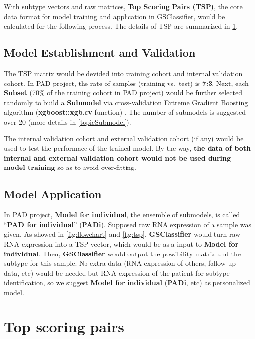 \documentclass[
  12pt,
]{book}
\begin{document}
With subtype vectors and raw matrices, \textbf{Top Scoring Pairs (TSP)}, the core data format for model training and application in GSClassifier, would be calculated for the following process. The details of TSP are summarized in \ref{topicTSP}.

\hypertarget{model-establishment-and-validation}{%
\subsection{Model Establishment and Validation}\label{model-establishment-and-validation}}

The TSP matrix would be devided into training cohort and internal validation cohort. In PAD project, the rate of samples (training vs.~test) is \textbf{7:3}. Next, each \textbf{Subset} (70\% of the training cohort in PAD project) would be further selected randomly to build a \textbf{Submodel} via cross-validation Extreme Gradient Boosting algorithm (\textbf{xgboost::xgb.cv} function) \citep{RN345}. The number of submodels is suggested over 20 (more details in \ref{topicSubmodel}).

The internal validation cohort and external validation cohort (if any) would be used to test the performace of the trained model. By the way, \textbf{the data of both internal and external validation cohort would not be used during model training} so as to avoid over-fitting.

\hypertarget{model-application}{%
\subsection{Model Application}\label{model-application}}

In PAD project, \textbf{Model for individual}, the ensemble of submodels, is called ``\textbf{PAD for individual}'' (\textbf{PADi}). Supposed raw RNA expression of a sample was given. As showed in \ref{fig:flowchart} and \ref{fig:tsp}, \textbf{GSClassifier} would turn raw RNA expression into a TSP vector, which would be as a input to \textbf{Model for individual}. Then, \textbf{GSClassifier} would output the possibility matrix and the subtype for this sample. No extra data (RNA expression of others, follow-up data, etc) would be needed but RNA expression of the patient for subtype identification, so we suggest \textbf{Model for individual} (\textbf{PADi}, etc) as personalized model.

\hypertarget{topicTSP}{%
\section{Top scoring pairs}\label{topicTSP}}
\end{document}
